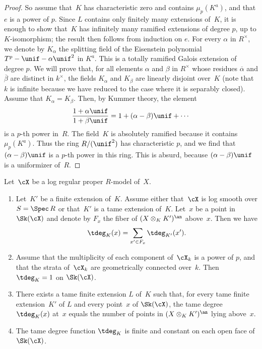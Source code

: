 \begin{proof}
So assume that~$K$ has characteristic zero and contains $\mu_p(K^a)$, and that $e$ is a power of $p$. Since $L$ contains only finitely many extensions of~$K$, it is enough to show that~$K$ has infinitely many ramified extensions of degree $p$, up to $K$\nobreakdash-isomorphism; the result then follows from induction on $e$. For every $\alpha$ in $R^{\times}$, we denote by $K_\alpha$ the splitting field of the Eisenstein polynomial $T^p-\unif-\alpha\unif^2$ in $K^a$. This is a totally ramified Galois extension of degree $p$.
We will prove that, for all elements $\alpha$ and $\beta$ in $R^{\times}$ whose residues $\overline{\alpha}$ and $\overline{\beta}$ are distinct in $k^{\times}$, the fields $K_\alpha$ and $K_\beta$ are linearly disjoint over~$K$ (note that~$k$ is infinite because we have reduced to the case where it is separably closed). Assume that $K_\alpha=K_\beta$.
Then, by Kummer theory, the element
\[
\frac{1+\alpha\unif}{1+\beta\unif}=1+(\alpha-\beta)\unif + \cdots
\]
is a $p$-th power in~$R$. The field~$K$ is absolutely ramified because it contains $\mu_p(K^a)$. Thus the ring $R/(\unif^2)$ has characteristic $p$, and we find that $(\alpha-\beta)\unif$ is a $p$-th power in this ring. This is absurd, because $(\alpha-\beta)\unif$ is a uniformizer of~$R$.
\end{proof}

\begin{prop}\label{prop:tamedeg}
Let~$\cX$ be a log regular proper $R$\nobreakdash-model of~$X$.
\begin{enumerate}
\item \label{it:fib} Let~$K'$ be a finite extension of~$K$. Assume either that~$\cX$ is log smooth over $S=\Spec\,R$ or that~$K'$ is a tame extension of~$K$. Let~$x$ be a point in $\Sk(\cX)$ and denote by $F_x$ the fiber of $(X\otimes_K K')^{\an}$ above~$x$. Then we have
\[
\tdeg_K(x)=\sum_{x'\in F_x}\tdeg_{K'}(x').
\]
\item \label{it:one} Assume that the multiplicity of each component of~$\cX_k$ is a power of $p$, and that the strata of~$\cX_k$ are geometrically connected over~$k$. Then $\tdeg_K=1$ on $\Sk(\cX)$.
\item \label{it:split} There exists a tame finite extension $L$ of~$K$ such that, for
every tame finite extension~$K'$ of $L$ and every point~$x$ of $\Sk(\cX)$, the tame degree $\tdeg_K(x)$ at~$x$ equals the number of points in $(X\otimes_K K')^{\an}$ lying above~$x$.
\item \label{it:const} The tame degree function $\tdeg_K$ is finite and constant on each open face of
$\Sk(\cX)$.
\end{enumerate}
\end{prop}

